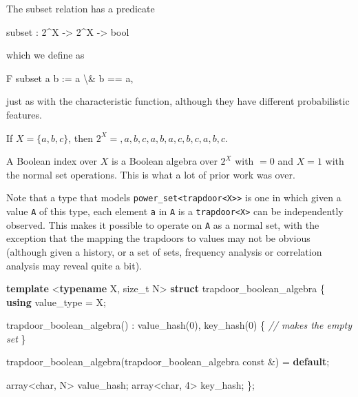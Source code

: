 \documentclass[
]{article}
\newenvironment{Shaded}{\begin{snugshade}}{\end{snugshade}}
\newcommand{\AttributeTok}[1]{\textcolor[rgb]{0.77,0.63,0.00}{#1}}
\newcommand{\CommentTok}[1]{\textcolor[rgb]{0.56,0.35,0.01}{\textit{#1}}}
\newcommand{\ControlFlowTok}[1]{\textcolor[rgb]{0.13,0.29,0.53}{\textbf{#1}}}
\newcommand{\DataTypeTok}[1]{\textcolor[rgb]{0.13,0.29,0.53}{#1}}
\newcommand{\DecValTok}[1]{\textcolor[rgb]{0.00,0.00,0.81}{#1}}
\newcommand{\KeywordTok}[1]{\textcolor[rgb]{0.13,0.29,0.53}{\textbf{#1}}}
\newcommand{\NormalTok}[1]{#1}
\begin{document}
The subset relation has a predicate

\begin{Shaded}
\begin{Highlighting}[]
\NormalTok{   subset : }\DecValTok{2}\NormalTok{\^{}X {-}\textgreater{} }\DecValTok{2}\NormalTok{\^{}X {-}\textgreater{} }\DataTypeTok{bool}
\end{Highlighting}
\end{Shaded}

which we define as

\begin{Shaded}
\begin{Highlighting}[]
\NormalTok{   F subset a b := a \textbackslash{}\& b == a,}
\end{Highlighting}
\end{Shaded}

just as with the characteristic function, although they have different
probabilistic features.

If \(X = \{a,b,c\}\), then
\(2^X = {{},{a},{b},{c},{a,b},{a,c},{b,c},{a,b,c}}\).

A Boolean index over \(X\) is a Boolean algebra over \(2^X\) with
\({}=0\) and \(X=1\) with the normal set operations. This is what a lot
of prior work was over.

Note that a type that models
\texttt{power\_set\textless{}trapdoor\textless{}X\textgreater{}\textgreater{}}
is one in which given a value \texttt{A} of this type, each element
\texttt{a} in \texttt{A} is a
\texttt{trapdoor\textless{}X\textgreater{}} can be independently
observed. This makes it possible to operate on \texttt{A} as a normal
set, with the exception that the mapping the trapdoors to values may not
be obvious (although given a history, or a set of sets, frequency
analysis or correlation analysis may reveal quite a bit).

\begin{Shaded}
\begin{Highlighting}[]
\KeywordTok{template}\NormalTok{ \textless{}}\KeywordTok{typename}\NormalTok{ X, }\DataTypeTok{size\_t}\NormalTok{ N\textgreater{}}
\KeywordTok{struct}\NormalTok{ trapdoor\_boolean\_algebra}
\NormalTok{\{}
    \KeywordTok{using} \DataTypeTok{value\_type}\NormalTok{ = X;}

\NormalTok{    trapdoor\_boolean\_algebra() :}
\NormalTok{        value\_hash(}\DecValTok{0}\NormalTok{),}
\NormalTok{        key\_hash(}\DecValTok{0}\NormalTok{)}
\NormalTok{    \{}
        \CommentTok{// makes the empty set}
\NormalTok{    \}}

\NormalTok{    trapdoor\_boolean\_algebra(trapdoor\_boolean\_algebra }\AttributeTok{const}\NormalTok{ \&) = }\ControlFlowTok{default}\NormalTok{;}

\NormalTok{    array\textless{}}\DataTypeTok{char}\NormalTok{, N\textgreater{} value\_hash;}
\NormalTok{    array\textless{}}\DataTypeTok{char}\NormalTok{, }\DecValTok{4}\NormalTok{\textgreater{} key\_hash;}
\NormalTok{\};}
\end{Highlighting}
\end{Shaded}
\end{document}
